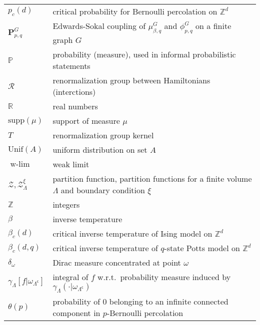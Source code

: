 \documentclass[12pt]{article}
\renewcommand{\P}{\mathbb{P}}
\newcommand{\PP}{\mathbf{P}}
\newcommand{\R}{\mathbb{R}}
\newcommand{\RR}{\mathcal{R}}
\newcommand{\Z}{\mathbb{Z}}
\newcommand{\ZZ}{\mathcal{Z}}
\newcommand{\pika}{\boldsymbol{\cdot}}
\newcommand{\1}{\mathbbm{1}}
\renewcommand{\c}{\mathsf{c}}
\newcommand{\supp}{\mathrm{supp}}
\newcommand{\5}{\vspace{0.5cm}}
\theoremstyle{definition}
\begin{document}
\begin{tabular}{p{4cm}p{10cm}}
$p_c(d)$ & critical probability for Bernoulli percolation on $\Z^d$ \\
$\PP_{p,q}^G$ & Edwards-Sokal coupling of $\mu_{\beta,q}^G$ and $\phi_{p,q}^G$ on a finite graph $G$ \\
$\P$ & probability (measure), used in informal probabilistic statements \\
$\RR$ & renormalization group between Hamiltonians (interctions) \\
$\R$ & real numbers \\
$\supp(\mu)$ & support of measure $\mu$ \\
$T$ & renormalization group kernel \\
$\mathrm{Unif}(A)$ & uniform distribution on set $A$ \\
$\text{w-}\lim$ & weak limit \\
$\ZZ,\ZZ_\Lambda^\xi$ & partition function, partition functions for a finite volume $\Lambda$ and boundary condition $\xi$ \\
$\Z$ & integers \\
$\beta$ & inverse temperature \\
$\beta_c(d)$ & critical inverse temperature of Ising model on $\Z^d$ \\
$\beta_c(d,q)$ & critical inverse temperature of $q$-state Potts model on $\Z^d$ \\
$\delta_\omega$ & Dirac measure concentrated at point $\omega$ \\
$\gamma_\Lambda[f|\omega_{\Lambda^\c}]$  & integral of $f$ w.r.t.~probability measure induced by $\gamma_\Lambda(\pika|\omega_{\Lambda^\c})$ \\
$\theta(p)$ & probability of $0$ belonging to an infinite connected component in $p$-Bernoulli percolation
\end{tabular}

\pagebreak
\end{document}
